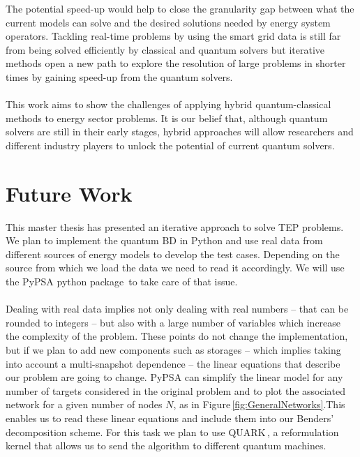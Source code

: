 The potential speed-up would help to close the granularity gap between what the current models can solve and the desired solutions needed by energy system operators. Tackling real-time problems by using the smart grid data is still far from being solved efficiently by classical and quantum solvers but iterative methods open a new path to explore the resolution of large problems in shorter times by gaining speed-up from the quantum solvers.\\\\
This work aims to show the challenges of applying hybrid quantum-classical methods to energy sector problems. It is our belief that, although quantum solvers are still in their early stages, hybrid approaches will allow researchers and different industry players to unlock the potential of current quantum solvers.
\section{Future Work}
This master thesis has presented an iterative approach to solve TEP problems. We plan to implement the quantum BD in Python and use real data from different sources of energy models to develop the test cases. Depending on the source from which we load the data we need to read it accordingly. We will use the PyPSA python package\,\cite{PyPSA-Eur:PyPSA-Eur} to take care of that issue.\\\\
Dealing with real data implies not only dealing with real numbers -- that can be rounded to integers -- but also with a large number of variables which increase the complexity of the problem. These points do not change the implementation, but if we plan to add new components such as storages -- which implies taking into account a multi-snapshot dependence -- the linear equations that describe our problem are going to change. PyPSA can simplify the linear model for any number of targets considered in the original problem and to plot the associated network for a given number of nodes $N$, as in Figure\,\ref{fig:GeneralNetworks}.This enables us to read these linear equations and include them into our Benders' decomposition scheme. For this task we plan to use QUARK\,\cite{dlrsc2023quark}, a reformulation kernel that allows us to send the algorithm to different quantum machines.
